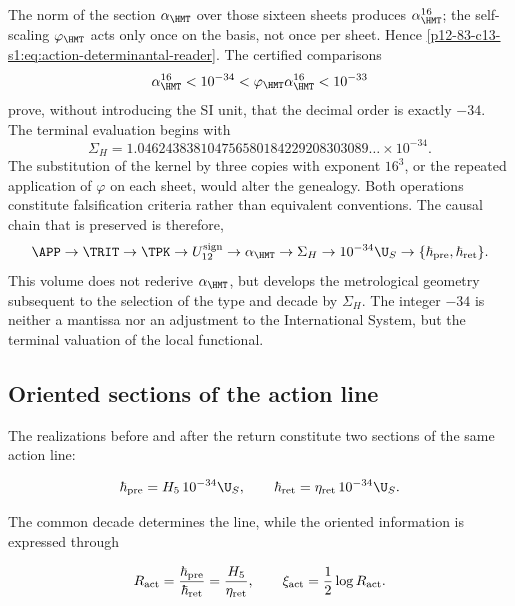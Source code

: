 The norm of the section \(\alpha_{\HMT}\) over those sixteen sheets
produces \(\alpha_{\HMT}^{16}\); the self-scaling \(\varphi_{\HMT}\) acts
only once on the basis, not once per sheet. Hence
\cref{p12-83-c13-s1:eq:action-determinantal-reader}. The certified comparisons
\begin{equation}
\alpha_{\HMT}^{16}<10^{-34}
<\varphi_{\HMT}\alpha_{\HMT}^{16}<10^{-33}
\label{p12-83-c13-s1:eq:action-decade-bounds}
\end{equation}
prove, without introducing the SI unit, that the decimal order is
exactly \(-34\). The terminal evaluation begins with
\begin{equation}
\Sigma_H
=1.046243838104756580184229208303089\ldots\times10^{-34}.
\label{p12-83-c13-s1:eq:action-sigma-value}
\end{equation}
The substitution of the kernel by three copies with exponent \(16^3\), or the repeated application of \(\varphi\) on each sheet, would alter the genealogy. Both operations constitute falsification criteria rather than equivalent conventions. The causal chain that is preserved is therefore,
\[
\APP\to\TRIT\to\TPK\to U_{12}^{\rm sign}
\to\alpha_{\HMT}\to\Sigma_H
\to10^{-34}\U_S\to
\{\hbar_{\rm pre},\hbar_{\rm ret}\}.
\]
This volume does not rederive \(\alpha_{\HMT}\), but develops the metrological geometry
subsequent to the selection of the type and decade by
\(\Sigma_H\). The integer \(-34\) is neither a mantissa nor an adjustment to the International
System, but the terminal valuation of the local functional.

\subsection{Oriented sections of the action line}

The realizations before and after the return constitute two sections
of the same action line:

\begin{equation}
\hbar_{\rm pre}=H_5\,10^{-34}\U_S,\qquad
\hbar_{\rm ret}=\eta_{\rm ret}\,10^{-34}\U_S.
\label{p12-83-c13-s1:eq:action-twoway}
\end{equation}

The common decade determines the line, while the oriented
information is expressed through

\begin{equation}
R_{\rm act}=\frac{\hbar_{\rm pre}}{\hbar_{\rm ret}}
=\frac{H_5}{\eta_{\rm ret}},
\qquad
\xi_{\rm act}=\frac12\log R_{\rm act}.
\label{p12-83-c13-s1:eq:action-rapidity}
\end{equation}

